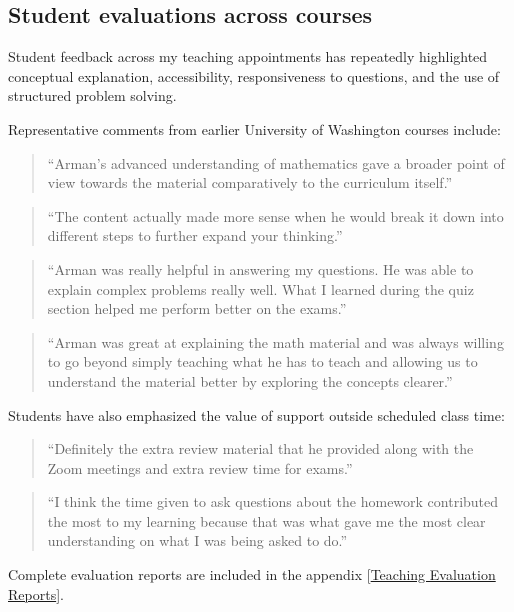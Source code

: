 \documentclass[11pt]{article}
\begin{document}
\subsection{Student evaluations across courses}

Student feedback across my teaching appointments has repeatedly
highlighted conceptual explanation,
accessibility,
responsiveness to questions,
and the use of structured problem solving.

Representative comments from earlier University of Washington
courses include:

\begin{quote}
``Arman's advanced understanding of mathematics gave a broader
point of view towards the material comparatively to the
curriculum itself.''
\end{quote}

\begin{quote}
``The content actually made more sense when he would break it
down into different steps to further expand your thinking.''
\end{quote}

\begin{quote}
``Arman was really helpful in answering my questions.
He was able to explain complex problems really well.
What I learned during the quiz section helped me perform
better on the exams.''
\end{quote}

\begin{quote}
``Arman was great at explaining the math material and was
always willing to go beyond simply teaching what he has to
teach and allowing us to understand the material better by
exploring the concepts clearer.''
\end{quote}

Students have also emphasized the value of support outside
scheduled class time:

\begin{quote}
``Definitely the extra review material that he provided along
with the Zoom meetings and extra review time for exams.''
\end{quote}

\begin{quote}
``I think the time given to ask questions about the homework
contributed the most to my learning because that was what gave
me the most clear understanding on what I was being asked to
do.''
\end{quote}

Complete evaluation reports are included in the appendix
[\hyperref[appendix:teaching-evaluations]{Teaching Evaluation Reports}].
\end{document}
